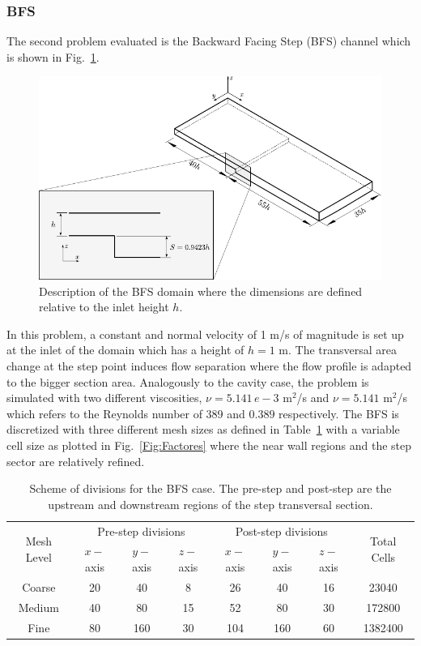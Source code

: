 \documentclass[final,3p,times,11pt,onecolumn]{myElsarticle}
\numberwithin{equation}{section}
\begin{document}
\subsubsection{BFS}
The second problem evaluated is the Backward Facing Step (BFS) channel which is shown in Fig.~\ref{Fig:Geometria3}.
\begin{figure}[b!!!!]
\centering
\includegraphics[width=12cm]{fig/Cases/Geometria3.pdf}
\caption{Description of the BFS domain where the dimensions are defined relative to the inlet height $h$.}
\label{Fig:Geometria3}
\end{figure}
In this problem, a constant and normal velocity of 1 m/s of magnitude is set up at the inlet of the domain which has a height of $h=1$ m. The transversal area change at the step point induces flow separation where the flow profile is adapted to the bigger section area. Analogously to the cavity case, the problem is simulated with two different viscosities, $\nu = 5.141\,e-3$ m$^2$/s and $\nu = 5.141$ m$^2$/s which refers to the Reynolds number of 389 and $0.389$ respectively. The BFS is discretized with three different mesh sizes as defined in Table~\ref{Table:BFSMeshes} with a variable cell size as plotted in Fig.~\ref{Fig:Factores} where the near wall regions and the step sector are relatively refined.
\begin{table}[b!]
\centering
\begin{tabular}{cccccccc}
\hline 
\multirow{2}{1cm}{Mesh Level} & \multicolumn{3}{c}{Pre-step divisions} & \multicolumn{3}{c}{Post-step divisions} & \multirow{2}{1cm}{Total Cells} \\ 
\cline{2-7} 
&  $x-$axis &  $y-$axis &  $z-$axis &  $x-$axis &  $y-$axis &  $z-$axis \\ 
\hline 
Coarse & 20 & 40 & 8 & 26 & 40 & 16 & 23040 \\ 
Medium & 40 & 80 & 15 & 52 & 80 & 30 & 172800 \\ 
Fine & 80 & 160 & 30 & 104 & 160 & 60 & 1382400 \\ 
\hline 
\end{tabular}
\caption{Scheme of divisions for the BFS case. The pre-step and post-step are the upstream and downstream regions of the step transversal section.}
\label{Table:BFSMeshes}
\end{table}
\end{document}
